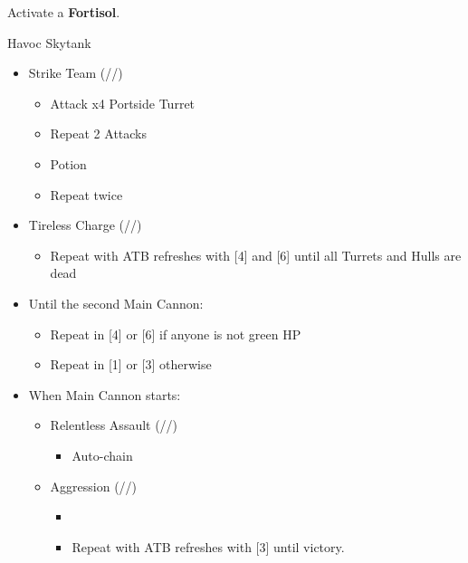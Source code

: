 \renewcommand{\first}{[1] Aggression (\com/\com/\rav)}
\renewcommand{\second}{[2] Relentless Assault (\rav/\com/\rav)}
\renewcommand{\third}{[3] Aggression (\com/\com/\rav)}
\renewcommand{\fourth}{[4] Tireless Charge (\com/\com/\med)}
\renewcommand{\fifth}{[5] Strike Team (\com/\com/\syn)}
\renewcommand{\sixth}{[6] Tireless Charge (\com/\com/\med)}

Activate a \textbf{Fortisol}.

\begin{battle}{Havoc Skytank}
\begin{itemize}
    \item \fifth
    \begin{itemize}
        \item Attack x4 Portside Turret
        \item Repeat 2 Attacks
        \item Potion
        \item Repeat twice
    \end{itemize}
    \item \fourth
    \begin{itemize}
        \item Repeat with ATB refreshes with [4] and [6] until all Turrets and Hulls are dead
    \end{itemize}
    \item Until the second Main Cannon:
    \begin{itemize}
        \item Repeat in [4] or [6] if anyone is not green HP
        \item Repeat in [1] or [3] otherwise
    \end{itemize}
    \item When Main Cannon starts:
    \begin{itemize}
        \item \second
        \begin{itemize}
            \item Auto-chain
        \end{itemize}
        \item \first
        \begin{itemize}
            \item \stagger
            \item Repeat with ATB refreshes with [3] until victory.
        \end{itemize}
    \end{itemize}
\end{itemize}
\end{battle}
